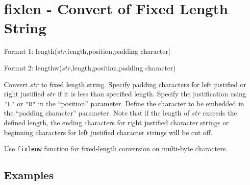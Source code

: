 
%

\section{fixlen - Convert of Fixed Length String\label{sect:fixlen}}

Format 1: length($str$,length,position,padding character)

Format 2: lengthw($str$,length,position,padding character)

Convert $str$ to fixed length string. Specify padding characters for left justified or right justified $str$ if it is less than specified length. Specify the justification using \verb|"L"| or \verb|"R"| in the “position” parameter. Define the character to be embedded in the “padding character” parameter. Note that if the length of $str$ exceeds the defined length, the ending characters for right justified character strings or beginning characters for left justified character strings will be cut off. 

Use \verb|fixlenw| function for fixed-length conversion on multi-byte characters. 

\subsection*{Examples}


%


